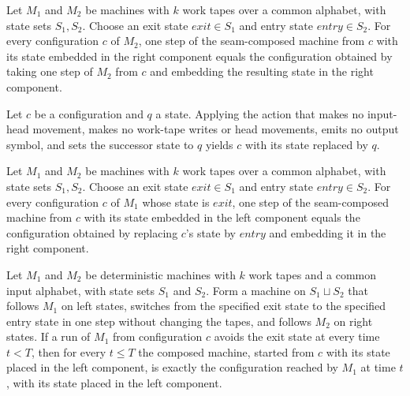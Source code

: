\begin{lemma}
\label{Turing.seamComp_step_right}
\leanok
{}
Let $M_1$ and $M_2$ be machines with $k$ work tapes over a common alphabet, with state
sets $S_1,S_2$. Choose an exit state $exit\in S_1$ and entry state $entry\in S_2$. For
every configuration $c$ of $M_2$, one step of the seam-composed machine from $c$ with
its state embedded in the right component equals the configuration obtained by taking
one step of $M_2$ from $c$ and embedding the resulting state in the right component.
\end{lemma}

\begin{lemma}
\label{Turing.seam_stationary_apply}
\leanok
{}
Let $c$ be a configuration and $q$ a state. Applying the action that makes no input-head
movement, makes no work-tape writes or head movements, emits no output symbol, and sets
the successor state to $q$ yields $c$ with its state replaced by $q$.
\end{lemma}

\begin{lemma}
\label{Turing.seamComp_dispatch}
\leanok
{}
Let $M_1$ and $M_2$ be machines with $k$ work tapes over a common alphabet, with state
sets $S_1,S_2$. Choose an exit state $exit\in S_1$ and entry state $entry\in S_2$. For
every configuration $c$ of $M_1$ whose state is $exit$, one step of the seam-composed
machine from $c$ with its state embedded in the left component equals the configuration
obtained by replacing $c$'s state by $entry$ and embedding it in the right component.
\end{lemma}

\begin{theorem}
\label{Turing.seamCompTM_runFrom_left}
\leanok
{}
Let $M_1$ and $M_2$ be deterministic machines with $k$ work tapes and a common input
alphabet, with state sets $S_1$ and $S_2$. Form a machine on $S_1\sqcup S_2$ that
follows $M_1$ on left states, switches from the specified exit state to the specified
entry state in one step without changing the tapes, and follows $M_2$ on right states.
If a run of $M_1$ from configuration $c$ avoids the exit state at every time $t<T$, then
for every $t\le T$ the composed machine, started from $c$ with its state placed in the
left component, is exactly the configuration reached by $M_1$ at time $t$, with its
state placed in the left component.
\end{theorem}

